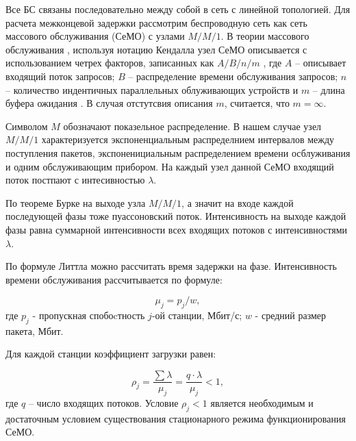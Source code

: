 Все БС связаны последовательно между собой в сеть с линейной топологией. Для расчета межконцевой задержки рассмотрим беспроводную сеть как сеть массового обслуживания (СеМО) с узлами $M/M/1$. В теории массового обслуживания , используя нотацию Кендалла узел СеМО описывается с использованием четрех факторов, записанных как $A / B/ n / m $ , где $A$ -- описывает входящий поток запросов; $B$ -- распределение времени обслуживания запросов; $n$ -- количество индентичных параллельных облуживающих устройств и $m$ -- длина буфера ожидания \cite{VishnevskyBook}. В случая отстутсвия описания $m$, считается, что $m = \infty$.

Символом $M$ обозначают показельное распределение. В нашем случае узел $M/M/1$ характеризуется экспоненциальным распределнием интервалов между поступления пакетов, экспоненициальным распределением времени осблуживания и одним обслуживающим прибором. На каждый узел данной СеМО входящий поток постпают с интесивностью $\lambda$. 

По теореме Бурке \cite{Burke1956} на выходе узла $M/M/1$, а значит на входе каждой последующей фазы тоже пуассоновский поток. Интенсивность на выходе каждой фазы равна суммарной интенсивности всех входящих потоков с интенсивностями $\lambda$.

По формуле Литтла \cite{Little1961} можно рассчитать время задержки на фазе. Интенсивность времени обслуживания рассчитывается по формуле: 

\begin{displaymath}
    \mu_j = p_j / w,
\end{displaymath}
где $p_j$ - пропускная спобоcтность $j$-ой станции, Мбит/с; $w$ - средний размер пакета, Мбит.

Для каждой станции коэффициент загрузки равен:


\begin{displaymath}
\rho_j= \frac{\sum{\lambda}}{\mu_j} = \frac{q \cdot \lambda}{\mu_j} <1,
\end{displaymath}
где $q$ -- число входящих потоков. Условие $\rho_j<1$ является необходимым и достаточным условием существования стационарного режима функционирования СеМО.

